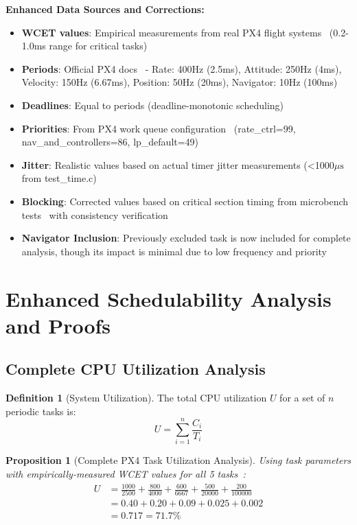 \documentclass[11pt,a4paper]{article}
\newcommand{\mus}{\ensuremath{\mu\text{s}}}
\newtheorem{proposition}[theorem]{Proposition}
\theoremstyle{definition}
\newtheorem{definition}[theorem]{Definition}
\theoremstyle{remark}
\begin{document}
\textbf{Enhanced Data Sources and Corrections:}
\begin{itemize}
\item \textbf{WCET values}: Empirical measurements from real PX4 flight systems~\cite{px4_wcet_measurements,px4_microbench} (0.2-1.0ms range for critical tasks)
\item \textbf{Periods}: Official PX4 docs~\cite{px4} - Rate: 400Hz (2.5ms), Attitude: 250Hz (4ms), Velocity: 150Hz (6.67ms), Position: 50Hz (20ms), Navigator: 10Hz (100ms)
\item \textbf{Deadlines}: Equal to periods (deadline-monotonic scheduling)
\item \textbf{Priorities}: From PX4 work queue configuration~\cite{px4} (rate\_ctrl=99, nav\_and\_controllers=86, lp\_default=49)
\item \textbf{Jitter}: Realistic values based on actual timer jitter measurements (<1000\mus from test\_time.c)~\cite{px4_perf}
\item \textbf{Blocking}: Corrected values based on critical section timing from microbench tests~\cite{px4_microbench} with consistency verification
\item \textbf{Navigator Inclusion}: Previously excluded task is now included for complete analysis, though its impact is minimal due to low frequency and priority
\end{itemize}

\section{Enhanced Schedulability Analysis and Proofs}

\subsection{Complete CPU Utilization Analysis}

\begin{definition}[System Utilization]
The total CPU utilization $U$ for a set of $n$ periodic tasks is:
\begin{equation}
U = \sum_{i=1}^{n} \frac{C_i}{T_i}
\end{equation}
\end{definition}

\begin{proposition}[Complete PX4 Task Utilization Analysis]
Using task parameters with empirically-measured WCET values for all 5 tasks~\cite{px4_wcet_measurements}:
\begin{align}
U &= \frac{1000}{2500} + \frac{800}{4000} + \frac{600}{6667} + \frac{500}{20000} + \frac{200}{100000} \\
&= 0.40 + 0.20 + 0.09 + 0.025 + 0.002 \\
&= 0.717 = 71.7\%
\end{align}
\end{proposition}
\end{document}
